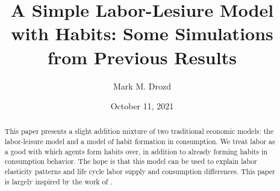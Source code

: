 \documentclass[ProjectMMD]{subfiles}
\begin{document}
\providecommand{\versn}{pdf} %
\ifthenelse{\boolean{Web}}{    %
  \renewcommand{\versn}{Web}     %
  \renewcommand{\rootFromOut}{.} %
}{}  %


\title{A Simple Labor-Lesiure Model with Habits: Some Simulations from Previous Results }

\author{Mark M. Drozd \authNum}


\renewcommand{\forcedate}{October 11, 2021}\date{\forcedate}

\maketitle
\hypertarget{abstract}{}
\begin{abstract}
  This paper presents a slight addition mixture of two traditional economic models: the labor-leisure model and a model of habit formation in consumption. We treat labor as a good with which agents form habits over, in addition to already forming habits in consumption behavior. The hope is that this model can be used to explain labor elasticity patterns and life cycle labor supply and consumption differences. This paper is largely inspired by the work of \cite{bover1991relaxing}.
\end{abstract}


\hypertarget{links}{}
\end{document}
